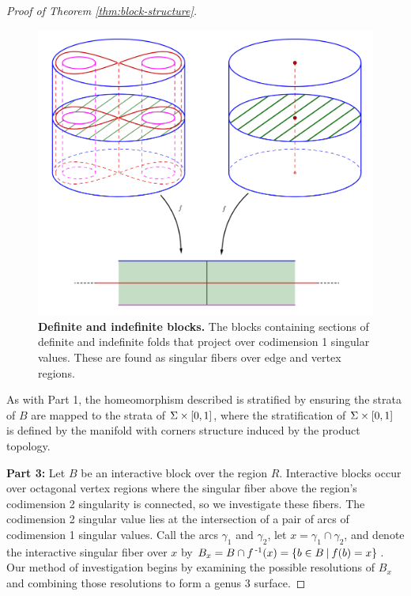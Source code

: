 \begin{proof}[Proof of Theorem \ref{thm:block-structure}]
	\begin{figure}[h!]
		\centering
		\includegraphics[width=\textwidth]{figures/codim-1-blocks.png}
		\caption{
			\textbf{Definite and indefinite blocks.}
			The blocks containing sections of definite and indefinite folds that project over codimension 1 singular values.
			These are found as singular fibers over edge and vertex regions.
		}
		\label{fig:codim-1-blocks}
	\end{figure}

	As with Part 1, the homeomorphism described is stratified by ensuring the strata of $B$ are mapped to the strata of $\Sigma \times [0,1]$, where the stratification of $\Sigma \times [0,1]$ is defined by the manifold with corners structure induced by the product topology.
	
	\textbf{Part 3:}	
	Let $B$ be an interactive block over the region $R$.
	Interactive blocks occur over octagonal vertex regions where the singular fiber above the region's codimension 2 singularity is connected, so we investigate these fibers.
	The codimension 2 singular value lies at the intersection of a pair of arcs of codimension 1 singular values.
	Call the arcs $\gamma_1$ and $\gamma_2$, let $x = \gamma_1\cap \gamma_2$, and denote the interactive singular fiber over $x$ by $B_x = B\cap f^{\,\text{-}1}(x) = \{b\in B\:|\:f(b)=x\}$.
	Our method of investigation begins by examining the possible resolutions of $B_x$ and combining those resolutions to form a genus 3 surface.
	 

\end{proof}
